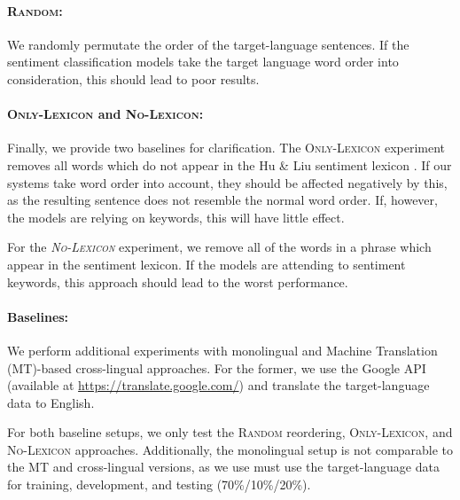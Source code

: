 \documentclass[a4paper,11pt,twocolumn,twoside]{article}
\newcommand{\random}{\textsc{Random}\xspace}
\newcommand{\onlylex}{\textsc{Only-Lexicon}\xspace}
\newcommand{\nolex}{\textsc{No-Lexicon}\xspace}
\begin{document}
\paragraph{\random: }We randomly permutate the order of the target-language sentences. If the sentiment classification models take the target language word order into consideration, this should lead to poor results.

\paragraph{\onlylex and \nolex: }Finally, we provide two baselines for clarification. The \onlylex experiment removes all words which do
not appear in the Hu \& Liu sentiment lexicon \cite{HuandLiu2004}. If our systems
take word order into account, they should be affected negatively by this, as the
resulting sentence does not resemble the normal word order. If, however, the models
are relying on keywords, this will have little effect.

For the \emph{\nolex} experiment, we remove all of the words
in a phrase which appear in the sentiment lexicon. If the models are attending to
sentiment keywords, this approach should lead to the worst performance. 

\paragraph{Baselines: }We perform additional experiments with monolingual and Machine Translation (MT)-based cross-lingual approaches. For the former, we use the Google API (available at \url{https://translate.google.com/}) and translate the target-language data to English. 

For both baseline setups, we only test the \random reordering, \onlylex, and \nolex approaches. Additionally, the monolingual setup is not comparable to the MT and cross-lingual versions, as we use must use the target-language data for training, development, and testing (70\%/10\%/20\%).
\end{document}
